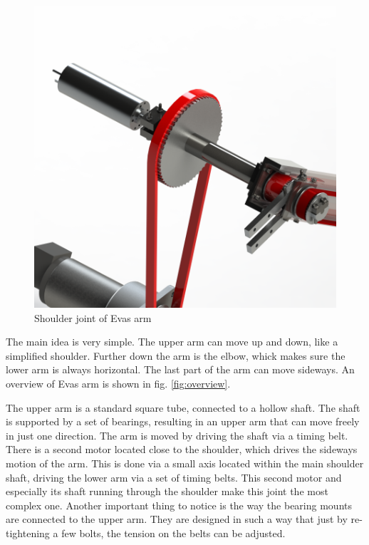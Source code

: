 \documentclass[technical_document.tex]{subfiles}
\begin{document}
\begin{figure}[ht!]
	\centering
	\mbox{\includegraphics[scale=1.0]{Images/arm_shoulder.png}}
	\caption{Shoulder joint of Eva\textquotesingle{}s arm}
	\label{fig:arm_shoulder}
\end{figure}

The main idea is very simple. The upper arm can move up and down, like a simplified shoulder. Further down the arm is the elbow, whick makes sure the lower arm is always horizontal. The last part of the arm can move sideways. An overview of Eva\textquotesingle{}s arm is shown in fig. \ref{fig:overview}.

The upper arm is a standard square tube, connected to a hollow shaft. The shaft is supported by a set of bearings, resulting in an upper arm that can move freely in just one direction. The arm is moved by driving the shaft via a timing belt. There is a second motor located close to the shoulder, which drives the sideways motion of the arm. This is done via a small axis located within the main shoulder shaft, driving the lower arm via a set of timing belts. This second motor and especially its shaft running through the shoulder make this joint the most complex one. Another important thing to notice is the way the bearing mounts are connected to the upper arm. They are designed in such a way that just by re-tightening a few bolts, the tension on the belts can be adjusted.
\end{document}
